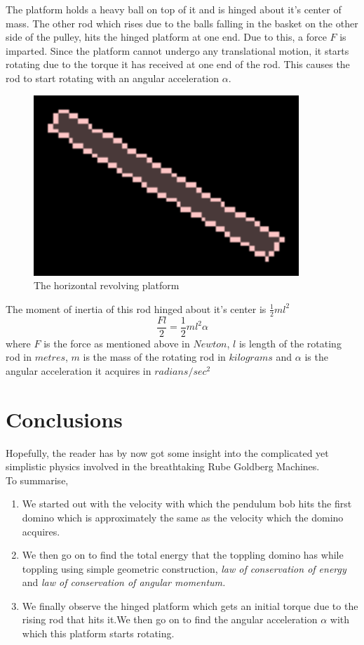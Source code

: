 \documentclass[11pt]{article}
\begin{document}
The platform holds a heavy ball on top of it and is hinged about it's center of mass. The other rod which rises due to the balls falling in the basket on the other side of the pulley, hits the hinged platform at one end. Due to this, a force $F$ is imparted. Since the platform cannot undergo any translational motion,
it starts rotating due to the torque it has received at one end of the rod. This causes the rod to start rotating with an angular acceleration $\alpha$. 
\begin{figure}[h!]
\caption{The horizontal revolving platform}
\centering
\includegraphics[width=10cm,scale=2]{rotplatform}
\end{figure}
The moment of inertia of this rod hinged about it's center is $\frac{1}{2}m l^2$ \cite{Wiki}
\begin{equation}
\frac{F l}{2} = \frac{1}{2}m l^2 \alpha
\end{equation}
where $F$ is the force as mentioned above in $Newton$, $l$ is length of the rotating rod in $metres$, $m$ is the mass of the rotating rod in $kilograms$ and $\alpha$ is the angular acceleration it acquires in $radians/{sec}^2$

\section{Conclusions}
Hopefully, the reader has by now got some insight into the complicated yet simplistic physics involved in the breathtaking Rube Goldberg Machines.
\\
To summarise, 
\begin{enumerate}
	\item We started out with the velocity with which the pendulum bob hits the first domino which is approximately the same as the velocity which the domino acquires.

	\item We then go on to find the total energy that the toppling domino has while toppling using simple geometric construction, \emph{law of conservation of energy} and \emph{law of conservation of angular momentum.}

	\item We finally observe the hinged platform which gets an initial torque due to the rising rod that hits it.We then go on to find the angular acceleration $\alpha$  with which this platform starts rotating.
\end{enumerate}


\end{document}
